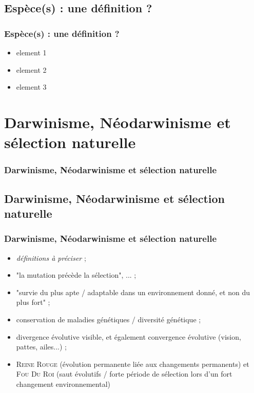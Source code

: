 \documentclass{beamer}
\begin{document}
\subsection{ Esp{\`e}ce(s) : une d{\'e}finition ? }
\begin{frame}
	\frametitle{ Esp{\`e}ce(s) : une d{\'e}finition ? }
	\begin{itemize}
		\item element 1
		\item element 2
		\item element 3
	\end{itemize}
\end{frame}


\section{Darwinisme, N{\'e}odarwinisme et s{\'e}lection naturelle }
\begin{frame}
	\frametitle{Darwinisme, N{\'e}odarwinisme et s{\'e}lection naturelle }
	\tableofcontents[sections=5,currentsection,subsectionstyle=show/shaded/hide]
\end{frame} 

\subsection{ Darwinisme, N{\'e}odarwinisme et s{\'e}lection naturelle }
\begin{frame}
	\frametitle{ Darwinisme, N{\'e}odarwinisme et s{\'e}lection naturelle }
	\begin{itemize}
		\item \emph{d{\'e}finitions {\`a} pr{\'e}ciser} ; 
		\item "la mutation pr{\'e}c{\`e}de la s{\'e}lection", ... ; 
		\item "survie du plus apte / adaptable dans un environnement donn{\'e}, et non du plus fort" ; 
		\item conservation de maladies g{\'e}n{\'e}tiques / diversit{\'e} g{\'e}n{\'e}tique ; 
		\item divergence {\'e}volutive visible, et {\'e}galement convergence {\'e}volutive (vision, pattes, ailes...) ; 
		\item \textsc{Reine Rouge} ({\'e}volution permanente li{\'e}e aux changements permanents) et \textsc{Fou Du Roi} (saut {\'e}volutifs / forte p{\'e}riode de s{\'e}lection lors d'un fort changement environnemental)
	\end{itemize}
\end{frame}
\end{document}
